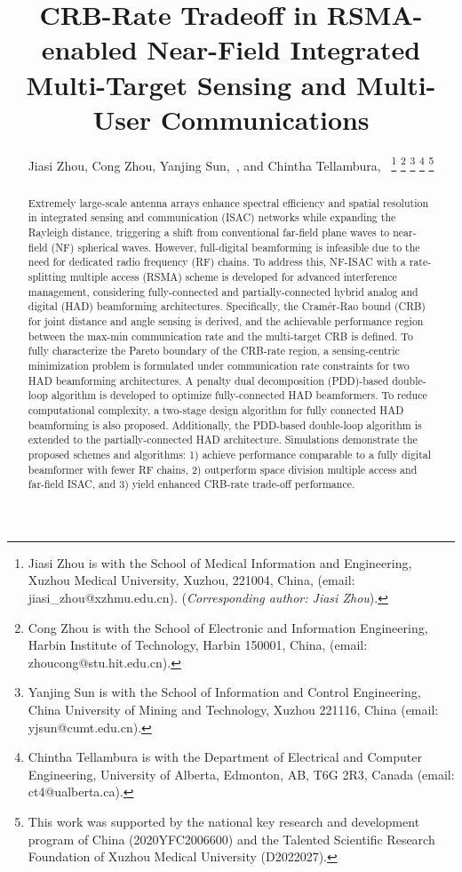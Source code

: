 \documentclass[10pt,journal,twocolumn]{IEEEtran}
\begin{document}
\title{CRB-Rate Tradeoff in RSMA-enabled Near-Field Integrated Multi-Target Sensing and Multi-User Communications}
	
\author{Jiasi Zhou, Cong Zhou, Yanjing Sun,~, and Chintha Tellambura,~
\thanks{Jiasi Zhou is with the School of Medical Information and Engineering, Xuzhou Medical University, Xuzhou, 221004, China, (email: jiasi\_zhou@xzhmu.edu.cn). (\emph{Corresponding author: Jiasi Zhou}).}
\thanks{Cong Zhou is with the School of Electronic and Information Engineering, Harbin Institute of Technology, Harbin 150001, China, (email: zhoucong@stu.hit.edu.cn).}
\thanks{Yanjing Sun is with the School of Information and Control Engineering, China University of Mining and Technology, Xuzhou 221116, China (email: yjsun@cumt.edu.cn).}
\thanks{ Chintha Tellambura is with the Department of Electrical and Computer Engineering, University of Alberta, Edmonton, AB, T6G 2R3, Canada (email: ct4@ualberta.ca).} 
\thanks{This work was supported by the national key research and development program of China (2020YFC2006600) and the Talented Scientific Research Foundation of Xuzhou Medical University (D2022027).}}
\maketitle

\begin{abstract}
Extremely large-scale antenna arrays enhance spectral efficiency and spatial resolution in integrated sensing and communication (ISAC) networks while expanding the Rayleigh distance, triggering a shift from conventional far-field plane waves to near-field (NF) spherical waves. However, full-digital beamforming is infeasible due to the need for dedicated radio frequency (RF) chains. To address this, NF-ISAC with a rate-splitting multiple access (RSMA) scheme is developed for advanced interference management, considering fully-connected and partially-connected hybrid analog and digital (HAD) beamforming architectures. Specifically, the Cram\'{e}r-Rao bound (CRB)  for joint distance and angle sensing is derived, and the achievable performance region between the max-min communication rate and the multi-target CRB is defined. To fully characterize the Pareto boundary of the CRB-rate region, a sensing-centric minimization problem is formulated under communication rate constraints for two HAD beamforming architectures. A penalty dual decomposition (PDD)-based double-loop algorithm is developed to optimize fully-connected HAD beamformers. To reduce computational complexity, a two-stage design algorithm for fully connected HAD beamforming is also proposed. Additionally, the PDD-based double-loop algorithm is extended to the partially-connected HAD architecture. Simulations demonstrate the proposed schemes and algorithms: 1) achieve performance comparable to a fully digital beamformer with fewer RF chains, 2) outperform space division multiple access and far-field ISAC, and 3) yield enhanced CRB-rate trade-off performance.
\end{abstract} 
\end{document}
